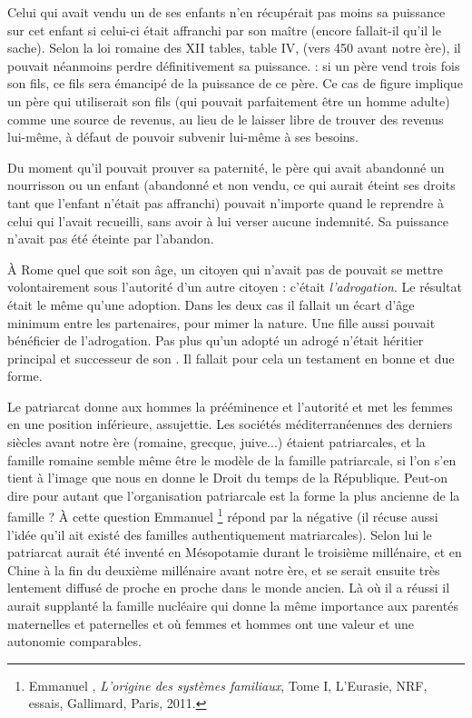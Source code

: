 Celui qui avait vendu un de ses enfants n'en récupérait pas moins
sa puissance  sur cet enfant si celui-ci était affranchi par son maître
(encore fallait-il qu'il le sache). Selon la loi romaine des XII tables, table
IV, (vers 450 avant notre ère), il pouvait néanmoins perdre définitivement
sa puissance. {}:
si un père vend trois fois son fils, ce fils sera émancipé de la puissance de
ce père. Ce cas de figure implique un père qui utiliserait son fils (qui
pouvait parfaitement être un homme adulte) comme une source de revenus,
au lieu de le laisser libre de trouver des revenus lui-même, à défaut
de pouvoir subvenir lui-même à ses besoins.

Du moment qu'il pouvait prouver sa paternité, le père qui avait
abandonné un nourrisson ou un enfant (abandonné et non vendu, ce qui
aurait éteint ses droits tant que l'enfant n'était pas affranchi) pouvait
n'importe quand le reprendre à celui qui l'avait recueilli, sans avoir à lui
verser aucune indemnité. Sa puissance n'avait pas été éteinte par l'abandon.

À Rome quel que soit son âge, un citoyen qui n'avait pas de  pouvait se mettre volontairement sous l'autorité d'un autre citoyen :
c'était \emph{l'adrogation}. Le résultat était le même qu'une adoption. Dans
les deux cas il fallait un écart d'âge minimum entre les partenaires, pour
mimer la nature. Une fille aussi pouvait bénéficier de l'adrogation. Pas
plus qu'un adopté un adrogé n'était  héritier principal et successeur
de son . Il fallait pour cela un testament en bonne et
due forme.




Le patriarcat donne aux hommes la prééminence
et l'autorité et met les femmes en une position inférieure, assujettie. Les sociétés méditerranéennes des derniers siècles avant notre ère
(romaine, grecque, juive...) étaient patriarcales, et la famille romaine
semble même être le modèle de la famille patriarcale, si l'on s'en tient à
l'image que nous en donne le Droit du temps de la République. Peut-on
dire pour autant que l'organisation patriarcale est la forme la plus ancienne
de la famille ? À cette question Emmanuel %
\footnote{Emmanuel , \emph{L'origine des systèmes familiaux}, Tome I, L'Eurasie, NRF,
essais, Gallimard, Paris, 2011.}
répond par
la négative (il récuse aussi l'idée qu'il ait existé des familles
authentiquement matriarcales).
Selon lui le patriarcat aurait été inventé en Mésopotamie durant le
troisième millénaire, et en Chine à la fin du deuxième millénaire avant
notre ère, et se serait ensuite très lentement diffusé de proche en proche
dans le monde ancien.  Là
où il a réussi il aurait  supplanté la famille nucléaire qui
donne la même importance aux parentés maternelles et paternelles et où
femmes et hommes ont une valeur et une autonomie comparables.

